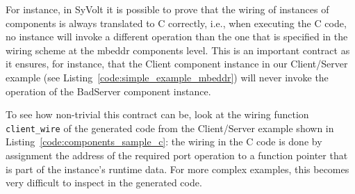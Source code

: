  For instance, in SyVolt it is possible to prove that the
wiring of instances of components is always translated to C correctly, i.e.,
when executing the C code, no instance will invoke a different operation than
the one that is specified in the wiring scheme at the mbeddr components level.
This is an important contract as it ensures, for instance, that the Client
component instance in our Client/Server example (see
Listing~\ref{code:simple_example_mbeddr}) will never invoke the operation of the
BadServer component instance.

To see how non-trivial this contract can be, look at the wiring function
\verb=client_wire= of the generated code from the Client/Server example shown in
Listing~\ref{code:components_sample_c}: the wiring in the C code is done by
assignment the address of the required port operation to a function pointer that
is part of the instance's runtime data. For more complex examples, this
becomes very difficult to inspect in the generated code.

